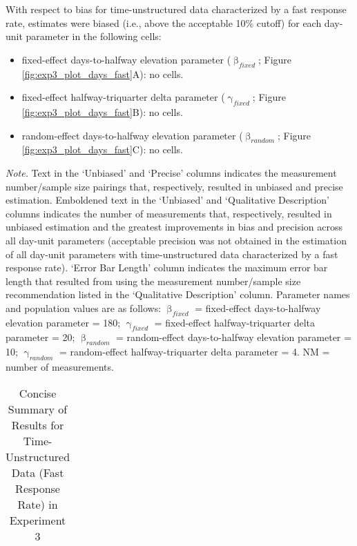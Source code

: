 \documentclass[
12pt, %
twoside,
english]{guelphthesis}
\begin{document}
With respect to bias for time-unstructured data characterized by a fast response rate, estimates were biased (i.e., above the acceptable 10\% cutoff) for each day-unit parameter in the following cells:
\begin{itemize}
\tightlist
\item
  fixed-effect days-to-halfway elevation parameter (\(\upbeta_{fixed}\); Figure \ref{fig:exp3_plot_days_fast}A): no cells.
\item
  fixed-effect halfway-triquarter delta parameter (\(\upgamma_{fixed}\); Figure \ref{fig:exp3_plot_days_fast}B): no cells.
\item
  random-effect days-to-halfway elevation parameter (\(\upbeta_{random}\); Figure \ref{fig:exp3_plot_days_fast}C): no cells.
\end{itemize}
\begin{landscape}
\begin{ThreePartTable}
\begin{TableNotes}
\item \textit{Note. }Text in the `Unbiased' and `Precise' columns indicates the measurement number/sample size pairings that, respectively, resulted in unbiased and precise estimation. Emboldened text in the `Unbiased' and `Qualitative Description' columns indicates the number of measurements that, respectively, resulted in unbiased estimation and the greatest improvements in bias and precision across all day-unit parameters (acceptable precision was not obtained in the estimation of all day-unit parameters with time-unstructured data characterized by a fast response rate). `Error Bar Length' column indicates the maximum error bar length that resulted from using the measurement number/sample size recommendation listed in the `Qualitative Description' column. Parameter names and population values are as follows: $\upbeta_{fixed}$ = fixed-effect days-to-halfway elevation parameter = 180; $\upgamma_{fixed}$ = fixed-effect halfway-triquarter delta parameter = 20; $\upbeta_{random}$ = random-effect days-to-halfway elevation parameter = 10; $\upgamma_{random}$ = random-effect halfway-triquarter delta parameter = 4. NM = number of measurements.
\end{TableNotes}
\begin{longtable}[l]{>{\raggedright\arraybackslash}p{3cm}>{\raggedright\arraybackslash}p{5cm}>{\raggedright\arraybackslash}p{5cm}>{\raggedright\arraybackslash}p{6.5cm}>{\raggedright\arraybackslash}p{3cm}}
\caption{\label{tab:summary-table-fast-exp3}Concise Summary of Results for Time-Unstructured Data (Fast Response Rate) in Experiment 3}\\

\end{longtable}
\end{ThreePartTable}
\end{landscape}
\end{document}
